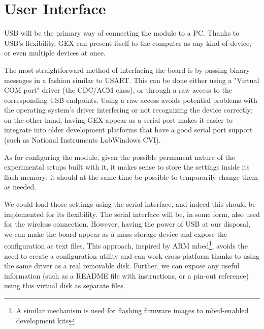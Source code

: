 \section{User Interface}

USB will be the primary way of connecting the module to a PC. Thanks to USB's flexibility, GEX can present itself to the computer as any kind of device, or even multiple devices at once. 

The most straightforward method of interfacing the board is by passing binary messages in a fashion similar to USART. This can be done either using a "Virtual COM port" driver (the CDC/ACM class), or through a raw access to the corresponding USB endpoints. Using a raw access avoids potential problems with the operating system's driver interfering or not recognizing the device correctly; on the other hand, having GEX appear as a serial port makes it easier to integrate into older development platforms that have a good serial port support (such as National Instruments LabWindows CVI).

As for configuring the module, given the possible permanent nature of the experimental setups built with it, it makes sense to store the settings inside its flash memory; it should at the same time be possible to temporarily change them as needed. 

We could load those settings using the serial interface, and indeed this should be implemented for its flexibility. The serial interface will be, in some form, also used for the wireless connection. However, having the power of USB at our disposal, we can make the board appear as a mass storage device and expose the configuration as text files. This approach, inspired by ARM mbed\footnote{A similar mechanism is used for flashing firmware images to mbed-enabled development kits}, avoids the need to create a configuration utility and can work cross-platform thanks to using the same driver as a real removable disk. Further, we can expose any useful information (such as a README file with instructions, or a pin-out reference) using this virtual disk as separate files.

